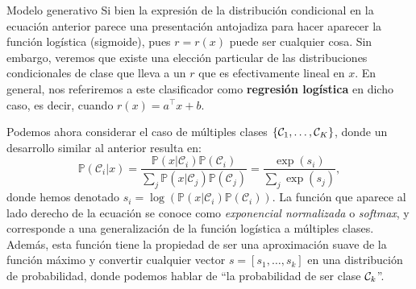 \documentclass[9pt]{beamer}
\begin{document}
\begin{frame}{Modelo generativo}
Si bien la expresión de la distribución condicional en la ecuación anterior parece una presentación antojadiza para hacer aparecer la  función logística (sigmoide), pues $r=r(x)$ puede ser cualquier cosa. Sin embargo, veremos que existe una elección particular de las distribuciones condicionales de clase que lleva a un $r$ que es efectivamente lineal en $x$. En general, nos  referiremos a este clasificador como \textbf{regresión logística} en dicho caso, es decir, cuando $r(x) = a^\top x  + b$. \pause

Podemos ahora considerar el caso de múltiples clases $\{{\mathcal C}_1,\ldots,{\mathcal C}_K\}$, donde un desarrollo similar al anterior resulta en:  
\begin{equation*}
  \mathbb{P}(\mathcal{C}_i | x) = \frac{\mathbb{P}(x | \mathcal{C}_i)\mathbb{P}(\mathcal{C}_i)}{\sum_{j}\mathbb{P}(x | \mathcal{C}_j)\mathbb{P}(\mathcal{C}_j)} = \frac{\exp(s_i)}{\sum_{j}\exp(s_j)},\label{eq:softmax1}  
\end{equation*}
\pause
donde hemos denotado $s_i = \log\left(\mathbb{P}(x | \mathcal{C}_i)\mathbb{P}(\mathcal{C}_i)\right)$. La función que aparece al lado derecho de la ecuación se conoce como \emph{exponencial normalizada} o \emph{softmax}, y corresponde a una generalización de la función logística a múltiples clases. \\Además, esta función tiene la propiedad de ser una aproximación suave de la función máximo y convertir cualquier vector $s=[s_1,\ldots,s_k]$ en una distribución de probabilidad, donde podemos hablar de ``la probabilidad de ser clase ${\mathcal C}_k$''.


\end{frame}



\end{document}

